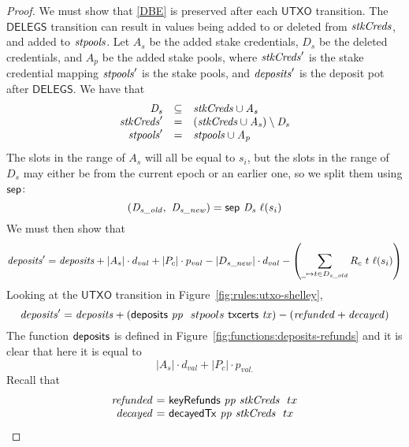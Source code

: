 \begin{proof}
  We must show that \ref{DBE} is preserved after each $\mathsf{UTXO}$ transition.
%
  The $\mathsf{DELEGS}$ transition can result in values being
  added to or deleted from $\mathit{stkCreds}$, and added to $\mathit{stpools}$.
  Let $A_s$ be the added stake credentials, $D_s$ be the deleted credentials, and
  $A_p$ be the added stake pools, where $\mathit{stkCreds}'$ is the stake credential mapping
   $\mathit{stpools}'$ is the stake pools, and $\mathit{deposits}'$ is the deposit pot  after $\mathsf{DELEGS}$.
  We have that
  \begin{equation*}
    \begin{array}{rcl}
      \mathit{D_s} & \subseteq & \mathit{\mathit{stkCreds}\cup\mathit{A_s}} \\
      \mathit{stkCreds}' & = & (\mathit{stkCreds}\cup\mathit{A_s})\setminus\mathit{D_s} \\
      \mathit{stpools}' & = & \mathit{stpools}\cup\mathit{A_p} \\
    \end{array}
  \end{equation*}
  The slots in the range of $A_s$ will all be equal to $s_i$,
  but the slots in the range of $D_s$
may either be from the current epoch or an earlier one, so we split them using $\mathsf{sep}$:
  \begin{equation*}
    (\mathit{D_{s\_old}},~\mathit{D_{s\_new}}) = \mathsf{sep}~\mathit{D_s}~\ell(s_i)
  \end{equation*}
  We must then show that
  \begin{equation*}
    \var{deposits}' = \var{deposits}
    + |A_s|\cdot d_{val}
    + |P_c|\cdot p_{val}
    - |D_{s\_new}|\cdot d_{val}
    - \left(\sum_{\wcard\mapsto t\in D_{s\_old}}R_c~t~\ell(s_i)\right)
  \end{equation*}
  Looking at the $\mathsf{UTXO}$ transition in Figure~\ref{fig:rules:utxo-shelley},
  \begin{equation*}
    \mathit{deposits}' = \mathit{deposits} + (\mathsf{deposits}~ \mathit{pp} ~ \mathit{~}{stpools}~{\mathsf{txcerts}~ \mathit{tx}})
    - (\mathit{refunded} + \mathit{decayed})
  \end{equation*}
  The function $\mathsf{deposits}$ is defined in Figure~\ref{fig:functions:deposits-refunds}
  and it is clear that here it is equal to
  $$|A_s|\cdot d_{val} + |P_c|\cdot p_{val.}$$
  Recall that
  \begin{equation*}
    \begin{array}{r@{~=~}l}
      \var{refunded} & \keyRefunds{pp}{stkCreds}~{tx} \\
      \var{decayed} & \decayedTx{pp}{stkCreds}~{tx}
    \end{array}

\end{equation*}
\end{proof}
